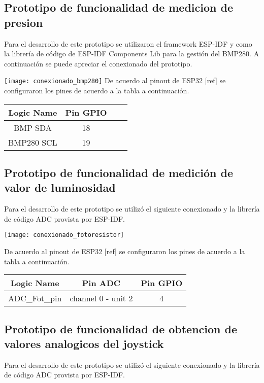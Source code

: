 \subsection{Prototipo de funcionalidad de medicion de presion}
Para el desarrollo de este prototipo se utilizaron el framework ESP-IDF y como la librería de código de ESP-IDF Components Lib para la gestión del BMP280. A continuación se puede apreciar el conexionado del prototipo.

\texttt{[image: conexionado\_bmp280]}
De acuerdo al pinout de ESP32 [ref] se configuraron los pines de acuerdo a la tabla a continuación. 

\begin{center}

\begin{tabular}{|c |c |c |c|} 
 \hline
 Logic Name & Pin GPIO  \\ [0.5ex] 
 \hline
 BMP SDA & 18 \\
 BMP280 SCL & 19  \\ [1ex] 
 \hline
\end{tabular}



\end{center}
\subsection{Prototipo de funcionalidad de medición de valor de luminosidad}
Para el desarrollo de este prototipo se utilizó el siguiente conexionado y la librería de código ADC provista por ESP-IDF. 

\texttt{[image: conexionado\_fotoresistor]}

De acuerdo al pinout de ESP32 [ref] se configuraron los pines de acuerdo a la tabla a continuación.

\begin{center}

\begin{tabular}{|c |c |c |} 
 \hline
 Logic Name & Pin ADC & Pin GPIO \\ [0.5ex] 
 \hline
 ADC_Fot_pin & channel 0 - unit 2 & 4\\ [1ex] 

 \hline
\end{tabular}


\end{center}
\subsection{Prototipo de funcionalidad de obtencion de valores analogicos del joystick}
Para el desarrollo de este prototipo se utilizó el siguiente conexionado y la librería de código ADC provista por ESP-IDF. 




